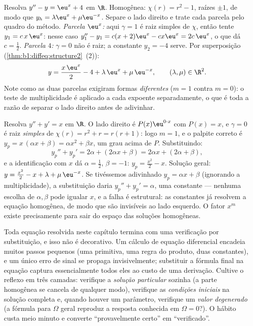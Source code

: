 \begin{example}\label{ex:b1:diffeq:superposition}
Resolva $y'' - y = \eu^{x} + 4$ em $\R$. Homogênea: $\chi(r) = r^2
- 1$, raízes $\pm1$, de modo que $y_h = \lambda\eu^x + \mu\eu^{-x}$. Separe
o lado direito e trate cada parcela pelo quadro do método.
\emph{Parcela $\eu^x$:} aqui $\gamma = 1$ é raiz simples de
$\chi$, então tente $y_1 = c\,x\,\eu^x$: nesse caso $y_1'' - y_1 = c(x +
2)\eu^x - cx\eu^x = 2c\,\eu^x$, o que dá $c = \frac12$.
\emph{Parcela $4$:} $\gamma = 0$ não é raiz; a constante $y_2 =
-4$ serve. Por superposição
(\cref{thm:b1:diffeq:structure2}~(2)):
\[
y = \frac{x\,\eu^x}2 - 4 + \lambda\,\eu^x + \mu\,\eu^{-x},
\qquad (\lambda, \mu) \in \R^2 .
\]
Note como as duas parcelas exigiram formas \emph{diferentes} ($m = 1$
contra $m = 0$): o teste de multiplicidade é aplicado a cada
expoente separadamente, o que é toda a razão de separar o
lado direito antes de adivinhar.
\end{example}

\begin{example}\label{ex:b1:diffeq:multiplicity}
Resolva $y'' + y' = x$ em $\R$. O lado direito é $P(x)\eu^{0
\cdot x}$
com $P(x) = x$, e $\gamma = 0$ é raiz \emph{simples}
de $\chi(r) = r^2 + r = r(r + 1)$: logo $m = 1$, e o palpite correto
é $y_p = x\,(\alpha x + \beta) = \alpha x^2 + \beta x$, um grau
acima de $P$. Substituindo:
\[
y_p'' + y_p' = 2\alpha + (2\alpha x + \beta)
= 2\alpha x + (2\alpha + \beta) ,
\]
e a identificação com $x$ dá $\alpha = \frac12$, $\beta = -1$:
$y_p = \frac{x^2}2 - x$. Solução geral: $y = \frac{x^2}2 - x +
\lambda + \mu\,\eu^{-x}$. Se tivéssemos adivinhado $y_p = \alpha x + \beta$
(ignorando a multiplicidade), a substituição daria $y_p'' + y_p'
= \alpha$, uma constante --- nenhuma escolha de $\alpha, \beta$ pode igualar
$x$, e a falha é estrutural: as constantes já resolvem a equação
homogênea, de modo que são invisíveis ao lado esquerdo.
O fator $x^m$ existe precisamente para sair do espaço das soluções
homogêneas.
\end{example}

\begin{remark}\label{rem:b1:diffeq:check}
Toda equação resolvida neste capítulo termina com uma verificação por
substituição, e isso não é decorativo. Um cálculo de equação
diferencial encadeia muitos passos pequenos (uma primitiva, uma regra
do produto, duas constantes), e um único erro de sinal se propaga
invisivelmente; substituir a fórmula final na equação captura
essencialmente todos eles ao custo de uma derivação.
Cultive o reflexo em três camadas: verifique a \emph{solução
particular} sozinha (a parte homogênea se cancela de qualquer modo),
verifique as \emph{condições iniciais} na solução completa e, quando
houver um parâmetro, verifique um \emph{valor degenerado} (a fórmula
para $\Omega$ geral reproduz a resposta conhecida em
$\Omega = 0$?). O hábito custa meio minuto e converte
``provavelmente certo'' em ``verificado''.
\end{remark}


